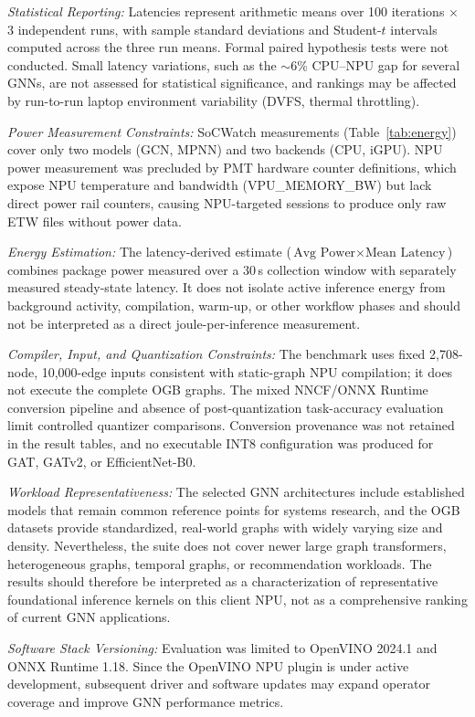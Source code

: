 \documentclass[conference]{IEEEtran}
\begin{document}
\textit{Statistical Reporting:} Latencies represent arithmetic means over 100 iterations $\times$ 3 independent runs, with sample standard deviations and Student-$t$ intervals computed across the three run means. Formal paired hypothesis tests were not conducted. Small latency variations, such as the $\sim$6\% CPU--NPU gap for several GNNs, are not assessed for statistical significance, and rankings may be affected by run-to-run laptop environment variability (DVFS, thermal throttling).

\textit{Power Measurement Constraints:} SoCWatch measurements (Table~\ref{tab:energy}) cover only two models (GCN, MPNN) and two backends (CPU, iGPU). NPU power measurement was precluded by PMT hardware counter definitions, which expose NPU temperature and bandwidth (VPU\_MEMORY\_BW) but lack direct power rail counters, causing NPU-targeted sessions to produce only raw ETW files without power data.

\textit{Energy Estimation:} The latency-derived estimate ($\text{Avg Power} \times \text{Mean Latency}$) combines package power measured over a 30\,s collection window with separately measured steady-state latency. It does not isolate active inference energy from background activity, compilation, warm-up, or other workflow phases and should not be interpreted as a direct joule-per-inference measurement.

\textit{Compiler, Input, and Quantization Constraints:} The benchmark uses fixed 2,708-node, 10,000-edge inputs consistent with static-graph NPU compilation; it does not execute the complete OGB graphs. The mixed NNCF/ONNX Runtime conversion pipeline and absence of post-quantization task-accuracy evaluation limit controlled quantizer comparisons. Conversion provenance was not retained in the result tables, and no executable INT8 configuration was produced for GAT, GATv2, or EfficientNet-B0.

\textit{Workload Representativeness:} The selected GNN architectures include established models that remain common reference points for systems research, and the OGB datasets provide standardized, real-world graphs with widely varying size and density. Nevertheless, the suite does not cover newer large graph transformers, heterogeneous graphs, temporal graphs, or recommendation workloads. The results should therefore be interpreted as a characterization of representative foundational inference kernels on this client NPU, not as a comprehensive ranking of current GNN applications.

\textit{Software Stack Versioning:} Evaluation was limited to OpenVINO 2024.1 and ONNX Runtime 1.18. Since the OpenVINO NPU plugin is under active development, subsequent driver and software updates may expand operator coverage and improve GNN performance metrics.
\end{document}
